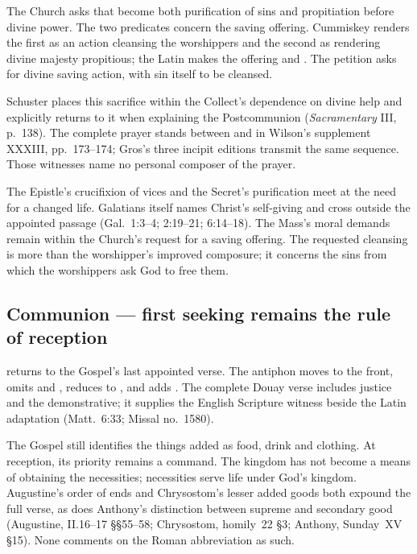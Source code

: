 The Church asks that  become both purification
of sins and propitiation before divine power. The two predicates concern the
saving offering. Cummiskey renders the first as an action cleansing the
worshippers and the second as rendering divine majesty propitious; the Latin
makes the offering  and . The petition
asks for divine saving action, with sin itself to be cleansed.

Schuster places this sacrifice within the Collect's dependence on divine help
and explicitly returns to it when explaining the Postcommunion
(\emph{Sacramentary} III, p.~138). The complete prayer stands between
 and  in Wilson's supplement XXXIII,
pp.~173--174; Gros's three incipit editions transmit the same sequence.
Those witnesses name no personal composer of the prayer.

The Epistle's crucifixion of vices and the Secret's purification meet at the
need for a changed life. Galatians itself names Christ's self-giving and
cross outside the appointed passage (Gal.~1:3--4; 2:19--21; 6:14--18).
The Mass's moral demands remain within the Church's request for a saving
offering. The requested cleansing is more than the worshipper's improved
composure; it concerns the sins from which the worshippers ask God to free
them.

\subsection*{Communion --- first seeking remains the rule of reception\enspace{}}\label{communion-treatment}

 returns to the Gospel's last appointed
verse. The antiphon moves  to the front, omits 
and , reduces  to ,
and adds . The complete Douay verse includes justice
and the demonstrative; it supplies the English Scripture witness beside the
Latin adaptation (Matt.~6:33; Missal no.~1580).

The Gospel still identifies the things added as food, drink and clothing.
At reception, its priority remains a command. The kingdom has not become a
means of obtaining the necessities; necessities serve life under God's
kingdom. Augustine's order of ends and Chrysostom's lesser added goods both
expound the full verse, as does Anthony's distinction between supreme and
secondary good (Augustine, II.16--17 §§55--58; Chrysostom, homily~22 §3;
Anthony, Sunday~XV §15). None comments on the Roman abbreviation as such.

